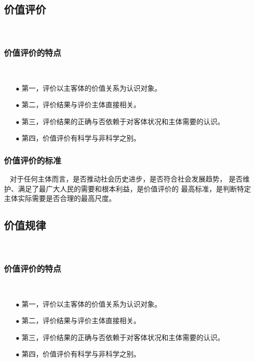 \documentclass{ctexart}
\begin{document}
\subsection{价值评价}~{}


\subsubsection{价值评价的特点}~{}
\vspace{-5mm}
\begin{itemize}
\item[$\bullet$]第一，评价以主客体的价值关系为认识对象。
\item[$\bullet$]第二，评价结果与评价主体直接相关。
\item[$\bullet$]第三，评价结果的正确与否依赖于对客体状况和主体需要的认识。
\item[$\bullet$]第四，价值评价有科学与非科学之别。  
\end{itemize}

\subsubsection{价值评价的标准}~{}
对于任何主体而言，是否推动社会历史进步，是否符合社会发展趋势，
是否维护、满足了最广大人民的需要和根本利益，是价值评价的
最高标准，是判断特定主体实际需要是否合理的最高尺度。

\subsection{价值规律}~{}


\subsubsection{价值评价的特点}~{}
\vspace{-5mm}
\begin{itemize}
\item[$\bullet$]第一，评价以主客体的价值关系为认识对象。
\item[$\bullet$]第二，评价结果与评价主体直接相关。
\item[$\bullet$]第三，评价结果的正确与否依赖于对客体状况和主体需要的认识。
\item[$\bullet$]第四，价值评价有科学与非科学之别。  
\end{itemize}
\end{document}
